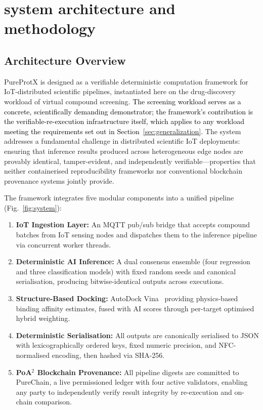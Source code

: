 \documentclass[conference]{IEEEtran}
\begin{document}
\section{\textbf{system architecture and methodology}}
\label{sec:methods}


\subsection{\textbf{Architecture Overview}}
\label{sec:arch}

PureProtX is designed as a verifiable deterministic computation
framework for IoT-distributed scientific pipelines, instantiated here
on the drug-discovery workload of virtual compound screening.
\textcolor{black}{The screening workload serves as a concrete,
scientifically demanding demonstrator; the framework's
contribution is the verifiable-re-execution infrastructure
itself, which applies to any workload meeting the
requirements set out in Section~\ref{sec:generalization}.}
The system addresses a fundamental challenge in distributed scientific
IoT deployments: ensuring that inference results produced across
heterogeneous edge nodes are provably identical, tamper-evident,
and independently verifiable---properties that neither containerised
reproducibility frameworks nor conventional blockchain provenance
systems jointly provide.

The framework integrates five modular components into a unified
pipeline (Fig.~\ref{fig:system}):

\begin{enumerate}
    \item \textbf{IoT Ingestion Layer:} An MQTT pub/sub bridge that
    accepts compound batches from IoT sensing nodes and dispatches
    them to the inference pipeline via concurrent worker threads.
    \item \textbf{Deterministic AI Inference:} A dual consensus
    ensemble (four regression and three classification models) with
    fixed random seeds and canonical serialisation, producing
    bitwise-identical outputs across executions.
    \item \textbf{Structure-Based Docking:} AutoDock Vina~\cite{eberhardt2021autodock}
    providing physics-based binding affinity estimates, fused with
    AI scores through per-target optimised hybrid weighting.
    \item \textbf{Deterministic Serialisation:} All outputs are
    canonically serialised to JSON with lexicographically ordered
    keys, fixed numeric precision, and NFC-normalised encoding,
    then hashed via SHA-256.
    \item \textbf{PoA$^2$ Blockchain Provenance:} All pipeline digests
    are committed to PureChain, a live permissioned ledger with
    four active validators, enabling any party to independently
    verify result integrity by re-execution and on-chain comparison.
\end{enumerate}
\end{document}
